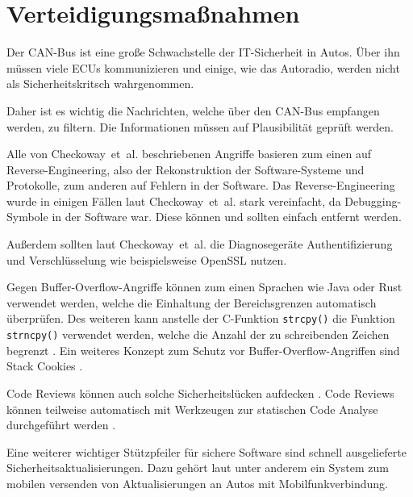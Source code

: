 \chapter{Verteidigungsmaßnahmen}\label{ch:defense}
Der CAN-Bus ist eine große Schwachstelle der IT-Sicherheit in Autos. Über ihn
müssen viele ECUs kommunizieren und einige, wie das Autoradio, werden nicht als
Sicherheitskritsch wahrgenommen.

Daher ist es wichtig die Nachrichten, welche über den CAN-Bus empfangen werden,
zu filtern. Die Informationen müssen auf Plausibilität geprüft werden.

Alle von Checkoway~et~al. beschriebenen Angriffe basieren zum einen auf
Reverse-Engineering, also der Rekonstruktion der Software-Systeme und
Protokolle, zum anderen auf Fehlern in der Software. Das Reverse-Engineering
wurde in einigen Fällen laut Checkoway~et~al. stark vereinfacht, da
Debugging-Symbole in der Software war. Diese können und sollten einfach
entfernt werden.

Außerdem sollten laut Checkoway~et~al. die Diagnosegeräte Authentifizierung und
Verschlüsselung wie beispielsweise OpenSSL nutzen.

Gegen Buffer-Overflow-Angriffe können zum einen Sprachen wie Java oder Rust
verwendet werden, welche die Einhaltung der Bereichsgrenzen automatisch
überprüfen. Des weiteren kann anstelle der C-Funktion \verb+strcpy()+ die
Funktion \verb+strncpy()+ verwendet werden, welche die Anzahl der zu
schreibenden Zeichen begrenzt \cite{Eckert2012}. Ein weiteres Konzept zum
Schutz vor Buffer-Overflow-Angriffen sind Stack Cookies \cite{Bray2002}.

Code Reviews können auch solche Sicherheitslücken aufdecken \cite{Howard2006}.
Code Reviews können teilweise automatisch mit Werkzeugen zur statischen Code
Analyse durchgeführt werden \cite{McGraw2008}.

Eine weiterer wichtiger Stützpfeiler für sichere Software sind schnell
ausgelieferte Sicherheitsaktualisierungen. Dazu gehört laut \cite{Mahaffey2015}
unter anderem ein System zum mobilen versenden von Aktualisierungen an Autos
mit Mobilfunkverbindung.